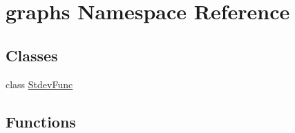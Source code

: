 \hypertarget{namespacegraphs}{}\section{graphs Namespace Reference}
\label{namespacegraphs}
\subsection*{Classes}
\begin{DoxyCompactItemize}
\item 
class \hyperlink{classgraphs_1_1StdevFunc}{Stdev\+Func}
\end{DoxyCompactItemize}
\subsection*{Functions}
